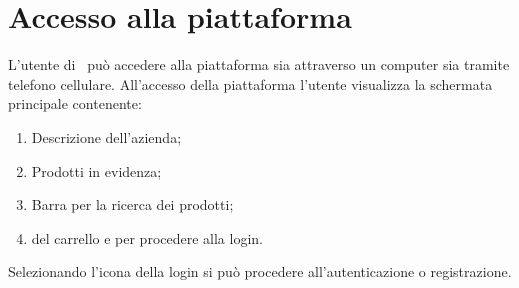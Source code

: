 \section{Accesso alla piattaforma}\label{Accesso}
L'utente di \NomeProgetto\ può accedere alla piattaforma sia attraverso un computer sia tramite telefono cellulare. All'accesso della piattaforma l'utente visualizza la schermata principale contenente:
\begin{enumerate}
	\item Descrizione dell'azienda;
	\item Prodotti in evidenza;
	\item Barra per la ricerca dei prodotti;
	\item {} del carrello e per procedere alla login.
\end{enumerate} 
Selezionando l'icona della login si può procedere all'autenticazione o registrazione.
